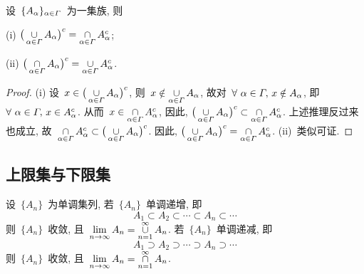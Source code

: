 \begin{theorem}
设~$\{A_\alpha\}_{\alpha \in \mathnormal{\Gamma}}$~为一集族, 则

(i) $\big( \mathop{\cup}\limits_{\small \alpha \in \mathnormal{\Gamma}} A_\alpha \big)^c = \mathop{\cap}\limits_{\small \alpha \in \mathnormal{\Gamma}} A^c _\alpha$;

(ii) $\big( \mathop{\cap}\limits_{\small \alpha \in \mathnormal{\Gamma}} A_\alpha \big)^c = \mathop{\cup}\limits_{\small \alpha \in \mathnormal{\Gamma}} A^c _\alpha$.
\end{theorem}

\begin{proof}
(i) 设~$x \in \big( \mathop{\cup}\limits_{\small \alpha \in \mathnormal{\Gamma}} A_\alpha \big)^c$, 则~$x \notin \mathop{\cup}\limits_{\small \alpha \in \mathnormal{\Gamma}} A_\alpha$, 故对~$\forall~\alpha \in \mathnormal{\Gamma}, \, x \notin A_\alpha$, 即~$\forall~\alpha \in \mathnormal{\Gamma}, \, x \in A^c _\alpha$. 从而~$x \in \mathop{\cap}\limits_{\small \alpha \in \mathnormal{\Gamma}} A^c _\alpha$, 因此, $\big( \mathop{\cup}\limits_{\small \alpha \in \mathnormal{\Gamma}} A_\alpha \big)^c \subset \mathop{\cap}\limits_{\small \alpha \in \mathnormal{\Gamma}} A^c _\alpha$. 上述推理反过来也成立, 故~$\mathop{\cap}\limits_{\small \alpha \in \mathnormal{\Gamma}} A^c _\alpha \subset \big( \mathop{\cup}\limits_{\small \alpha \in \mathnormal{\Gamma}} A_\alpha \big)^c$. 因此, $\big( \mathop{\cup}\limits_{\small \alpha \in \mathnormal{\Gamma}} A_\alpha \big)^c = \mathop{\cap}\limits_{\small \alpha \in \mathnormal{\Gamma}} A^c _\alpha$. (ii)~类似可证.
\end{proof}

\subsection{上限集与下限集}

设~$\{A_n\}$~为单调集列, 若~$\{A_n\}$~单调递增, 即
\[
A_1 \subset A_2 \subset \cdots \subset A_n \subset \cdots
\]
则~$\{A_n\}$~收敛, 且~$\lim \limits_{n \to \infty} A_n = \mathop{\cup}^\infty \limits_{n=1} A_n$. 若~$\{A_n\}$~单调递减, 即
\[
A_1 \supset A_2 \supset \cdots \supset A_n \supset \cdots
\]
则~$\{A_n\}$~收敛, 且~$\lim \limits_{n \to \infty} A_n = \mathop{\cap}^\infty \limits_{n=1} A_n$.

